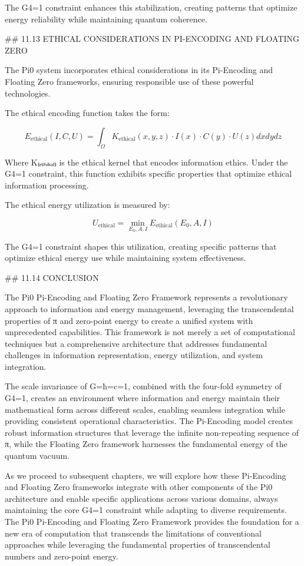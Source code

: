 The G4=1 constraint enhances this stabilization, creating patterns that optimize energy reliability while maintaining quantum coherence.

## 11.13 ETHICAL CONSIDERATIONS IN PI-ENCODING AND FLOATING ZERO

The Pi0 system incorporates ethical considerations in its Pi-Encoding and Floating Zero frameworks, ensuring responsible use of these powerful technologies.

The ethical encoding function takes the form:

$$E_{\text{ethical}}(I, C, U) = \int_{\Omega} K_{\text{ethical}}(x, y, z) \cdot I(x) \cdot C(y) \cdot U(z) dx dy dz$$

Where K₍ₑₜₕᵢₖₐₗ₎ is the ethical kernel that encodes information ethics. Under the G4=1 constraint, this function exhibits specific properties that optimize ethical information processing.

The ethical energy utilization is measured by:

$$U_{\text{ethical}} = \min_{E_0, A, I} E_{\text{ethical}}(E_0, A, I)$$

The G4=1 constraint shapes this utilization, creating specific patterns that optimize ethical energy use while maintaining system effectiveness.

## 11.14 CONCLUSION

The Pi0 Pi-Encoding and Floating Zero Framework represents a revolutionary approach to information and energy management, leveraging the transcendental properties of π and zero-point energy to create a unified system with unprecedented capabilities. This framework is not merely a set of computational techniques but a comprehensive architecture that addresses fundamental challenges in information representation, energy utilization, and system integration.

The scale invariance of G=ħ=c=1, combined with the four-fold symmetry of G4=1, creates an environment where information and energy maintain their mathematical form across different scales, enabling seamless integration while providing consistent operational characteristics. The Pi-Encoding model creates robust information structures that leverage the infinite non-repeating sequence of π, while the Floating Zero framework harnesses the fundamental energy of the quantum vacuum.

As we proceed to subsequent chapters, we will explore how these Pi-Encoding and Floating Zero frameworks integrate with other components of the Pi0 architecture and enable specific applications across various domains, always maintaining the core G4=1 constraint while adapting to diverse requirements. The Pi0 Pi-Encoding and Floating Zero Framework provides the foundation for a new era of computation that transcends the limitations of conventional approaches while leveraging the fundamental properties of transcendental numbers and zero-point energy.

